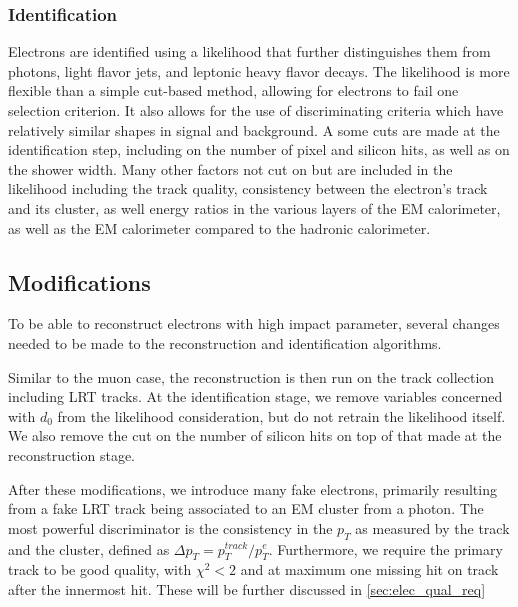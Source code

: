 \subsubsection{Identification}

Electrons are identified using a likelihood that further distinguishes them from photons, light flavor jets, and leptonic heavy flavor decays. The likelihood is more flexible than a simple cut-based method, allowing for electrons to fail one selection criterion. It also allows for the use of discriminating criteria which have relatively similar shapes in signal and background. A some cuts are made at the identification step, including on the number of pixel and silicon hits, as well as on the shower width. Many other factors not cut on but are included in the likelihood including the track quality, consistency between the electron's track and its cluster, as well energy ratios in the various layers of the \ac{EM} calorimeter, as well as the \ac{EM} calorimeter compared to the hadronic calorimeter.


\subsection{Modifications}
\label{sec:el_reco_mods}
To be able to reconstruct electrons with high impact parameter, several changes needed to be made to the reconstruction and identification algorithms. 

Similar to the muon case, the reconstruction is then run on the track collection including \ac{LRT} tracks. At the identification stage, we remove variables concerned with $d_{0}$ from the likelihood consideration, but do not retrain the likelihood itself. We also remove the cut on the number of silicon hits on top of that made at the reconstruction stage. 

After these modifications, we introduce many fake electrons, primarily resulting from a fake \ac{LRT} track being associated to an \ac{EM} cluster from a photon. The most powerful discriminator is the consistency in the $p_{T}$ as measured by the track and the cluster, defined as $\Delta p_{T} = p_{T}^{track}/p_{T}^{e}$. Furthermore, we require the primary track to be good quality, with $\chi^{2} < 2$ and at maximum one missing hit on track after the innermost hit. These will be further discussed in \autoref{sec:elec_qual_req}

